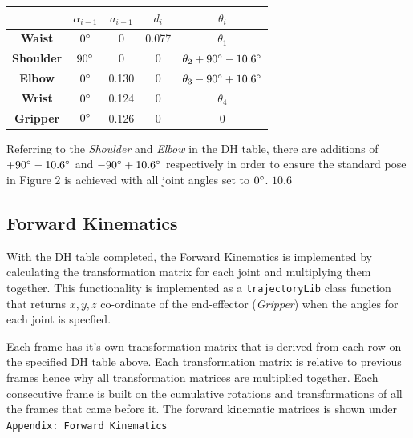 \documentclass[9pt, a4paper]{article}
\begin{document}
\begin{table}[h]
    \centering
    \begin{tabular}{|c|c|c|c|c|}
    \hline
    {\textbf{}} & {\textbf{$\alpha_{i-1}$}} & { \textbf{$a_{i-1}$}} & { \textbf{$d_i$}} & { \textbf{$\theta_i$}} \\ \hline
    \textbf{Waist}           & $0 \degree$                          & 0                        & 0.077                & $\theta_1$                \\ \hline
    \textbf{Shoulder}           & $90 \degree$                              & 0                        & 0                    & $\theta_2 + 90\degree - 10.6\degree$    \\ \hline
    \textbf{Elbow}           & $0 \degree$                               & 0.130                    & 0                    & $\theta_3 - 90\degree + 10.6\degree$    \\ \hline
    \textbf{Wrist}           & $0 \degree$                               & 0.124                    & 0                    & $\theta_4$                \\ \hline
    \textbf{Gripper}           & $0 \degree$                               & 0.126                    & 0                    & 0                         \\ \hline
    \end{tabular}
\end{table}

Referring to the \textit{Shoulder} and \textit{Elbow} in the DH table, there are
additions of $+90 \degree - 10.6\degree$ and $-90 \degree + 10.6\degree$ respectively in order to ensure the
standard pose in Figure 2 \cite{CAD_model} is achieved with all joint angles set to $0
\degree$.  $10.6$

\subsection{Forward Kinematics}

With the DH table completed, the Forward Kinematics is implemented by
calculating the transformation matrix for each joint and multiplying them
together. This functionality is implemented as a \verb+trajectoryLib+ class
function that returns $x,y,z$ co-ordinate of the end-effector (\textit{Gripper})
when the angles for each joint is specfied. 

Each frame has it's own transformation matrix that is derived from each row on
the specified DH table above.  Each transformation matrix is relative to
previous frames hence why all transformation matrices are multiplied together.
Each consecutive frame is built on the cumulative rotations and transformations
of all the frames that came before it. The forward kinematic matrices is
shown under \verb+Appendix: Forward Kinematics+
\end{document}
